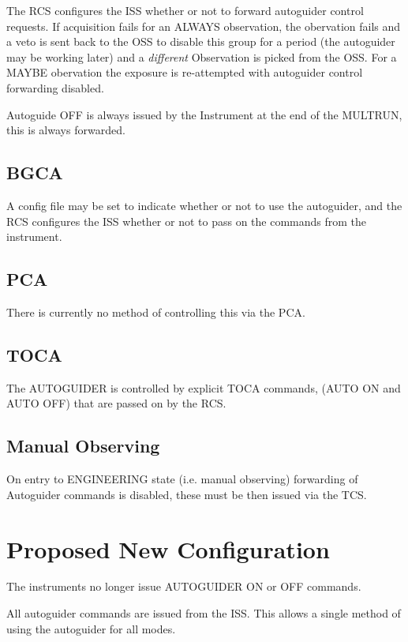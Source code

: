 \documentclass{article}
\begin{document}
The RCS configures the ISS whether or not to forward autoguider control requests. 
If acquisition fails for an ALWAYS observation, 
the obervation fails and a veto is sent back to the OSS to disable this group for a period 
(the autoguider may be working later) and a {\em different} {\rm Observation}
is picked from the OSS. For a MAYBE obervation the exposure is re-attempted with 
autoguider control forwarding disabled.

Autoguide OFF is always issued by the Instrument at the
end of the MULTRUN, this is always forwarded.

\subsection{BGCA}

A config file may be set to indicate whether or not
to use the autoguider, and the RCS configures the ISS
whether or not to pass on the commands from the instrument.

\subsection{PCA}

There is currently no method of controlling this
via the PCA. 

\subsection{TOCA}

The AUTOGUIDER is controlled by explicit TOCA
commands, (AUTO ON and AUTO OFF) that are passed on by the RCS.

\subsection{Manual Observing}

On entry to ENGINEERING state (i.e. manual observing) forwarding of
Autoguider commands is disabled, these must be then issued via the TCS.

\section{Proposed New Configuration}

The instruments no longer issue AUTOGUIDER ON 
or OFF commands.

All autoguider commands are issued from the ISS.
This allows a single method of using the 
autoguider for all modes. 
\end{document}
